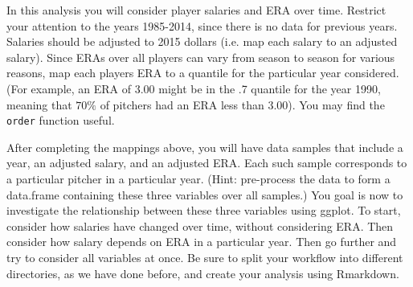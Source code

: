 \documentclass{article}
\begin{document}
In this analysis you will consider player salaries and ERA over time.   Restrict your attention to the years 1985-2014, since there is no data for previous years.    Salaries should be adjusted to 2015 dollars (i.e. map each salary to an adjusted salary).  Since  ERAs over all players can vary from season to season for various reasons, map each players ERA to a quantile for the particular year considered.  (For example, an ERA of 3.00 might be in the .7 quantile for the year 1990, meaning that $70\%$ of pitchers had an ERA less than 3.00).  You may find the \verb+order+ function useful.   

	After completing the mappings above, you will have data samples that include a year, an adjusted salary, and an adjusted ERA. Each such sample corresponds to a particular pitcher in a particular year.   (Hint: pre-process the data to form a data.frame containing these three variables over all samples.) You goal is now to investigate the relationship between these three variables using ggplot.  To start, consider how salaries have changed over time, without considering ERA.  Then consider how salary depends on ERA in a particular year.  Then go further and try to consider all variables at once.   Be sure to split your workflow into different directories, as we have done before, and create your analysis using Rmarkdown.
\end{document}
